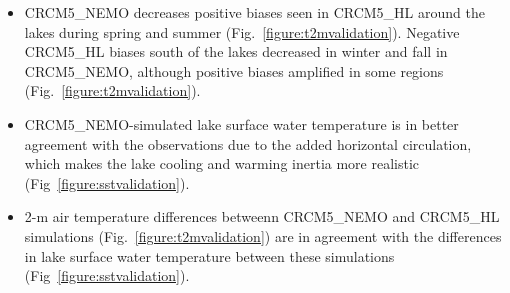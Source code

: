 \documentclass[a0b,landscape]{a0poster}
\begin{document}
\begin{multicols*}{4}
\begin{itemize}
    \item CRCM5\_NEMO decreases positive biases seen in CRCM5\_HL around the lakes during spring and summer (Fig.~\ref{figure:t2mvalidation}).
    Negative CRCM5\_HL biases south of the lakes decreased in winter and fall in CRCM5\_NEMO, although positive biases amplified in some regions (Fig.~\ref{figure:t2mvalidation}).
    \item CRCM5\_NEMO-simulated lake surface water temperature is in better agreement with
          the observations due to the added horizontal circulation, which makes the lake
          cooling and warming inertia more realistic (Fig~\ref{figure:sstvalidation}).
    \item 2-m air temperature differences betweenn CRCM5\_NEMO and
          CRCM5\_HL simulations (Fig.~\ref{figure:t2mvalidation}) are in agreement with the
          differences in lake surface water temperature between these simulations
          (Fig~\ref{figure:sstvalidation}).
\end{itemize}



\end{multicols*}
\end{document}

